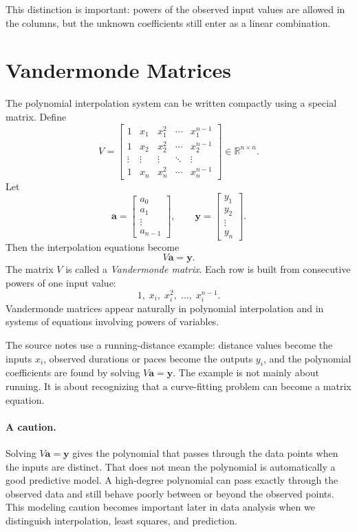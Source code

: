 This distinction is important: powers of the observed input values are allowed in the columns, but the unknown coefficients still enter as a linear combination.

\section{Vandermonde Matrices}
\label{mf:vandermonde-matrices}

The polynomial interpolation system can be written compactly using a special matrix. Define
\[
    V=
    \begin{bmatrix}
        1 & x_1 & x_1^2 & \cdots & x_1^{n-1}\\
        1 & x_2 & x_2^2 & \cdots & x_2^{n-1}\\
        \vdots & \vdots & \vdots & \ddots & \vdots\\
        1 & x_n & x_n^2 & \cdots & x_n^{n-1}
    \end{bmatrix}
    \in\mathbb{R}^{n\times n}.
\]
Let
\[
    \mathbf{a}=\begin{bmatrix}a_0\\a_1\\\vdots\\a_{n-1}\end{bmatrix},
    \qquad
    \mathbf{y}=\begin{bmatrix}y_1\\y_2\\\vdots\\y_n\end{bmatrix}.
\]
Then the interpolation equations become
\[
    V\mathbf{a}=\mathbf{y}.
\]
The matrix \(V\) is called a \emph{Vandermonde matrix}. Each row is built from consecutive powers of one input value:
\[
    1,\;x_i,\;x_i^2,\;\ldots,\;x_i^{n-1}.
\]
Vandermonde matrices appear naturally in polynomial interpolation and in systems of equations involving powers of variables.

The source notes use a running-distance example: distance values become the inputs \(x_i\), observed durations or paces become the outputs \(y_i\), and the polynomial coefficients are found by solving \(V\mathbf{a}=\mathbf{y}\). The example is not mainly about running. It is about recognizing that a curve-fitting problem can become a matrix equation.

\paragraph{A caution.}
Solving \(V\mathbf{a}=\mathbf{y}\) gives the polynomial that passes through the data points when the inputs are distinct. That does not mean the polynomial is automatically a good predictive model. A high-degree polynomial can pass exactly through the observed data and still behave poorly between or beyond the observed points. This modeling caution becomes important later in data analysis when we distinguish interpolation, least squares, and prediction.


